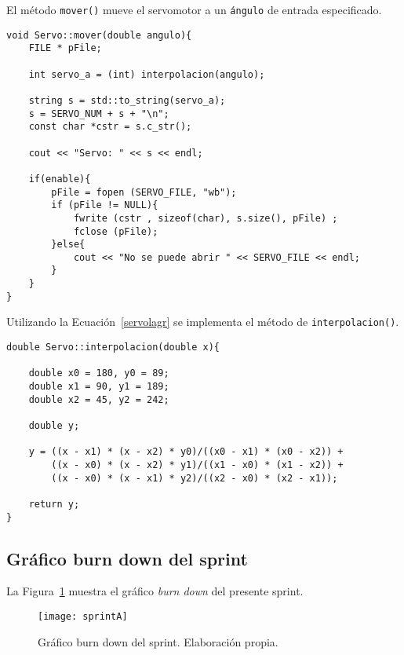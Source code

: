 El método \texttt{mover()} mueve el servomotor a un \texttt{ángulo} de entrada especificado.
\begin{lstlisting}[label=mover,caption=Método para mover un servomotor]
void Servo::mover(double angulo){
    FILE * pFile;

    int servo_a = (int) interpolacion(angulo);
    
    string s = std::to_string(servo_a);
    s = SERVO_NUM + s + "\n";
    const char *cstr = s.c_str();
    
    cout << "Servo: " << s << endl;

    if(enable){
        pFile = fopen (SERVO_FILE, "wb");
        if (pFile != NULL){
            fwrite (cstr , sizeof(char), s.size(), pFile) ;
            fclose (pFile);
        }else{
            cout << "No se puede abrir " << SERVO_FILE << endl;
        }
    }
}
\end{lstlisting}

Utilizando la Ecuación~\ref{servolagr} se implementa el método de \texttt{interpolacion()}.

\begin{lstlisting}[label=interpolacion,caption=Método para transformar de grados a modulación por ancho de pulso.]
double Servo::interpolacion(double x){
    
    double x0 = 180, y0 = 89;
    double x1 = 90, y1 = 189;
    double x2 = 45, y2 = 242;

    double y;

    y = ((x - x1) * (x - x2) * y0)/((x0 - x1) * (x0 - x2)) + 
        ((x - x0) * (x - x2) * y1)/((x1 - x0) * (x1 - x2)) + 
        ((x - x0) * (x - x1) * y2)/((x2 - x0) * (x2 - x1));

    return y;
}

\end{lstlisting}

\subsection{Gráfico burn down del sprint}
La Figura~\ref{fig:sprintA} muestra el gráfico \emph{burn down} del presente sprint.

\begin{figure}
  \centering
    \texttt{[image: sprintA]}
  \caption{Gráfico burn down del sprint. Elaboración propia.}
  \label{fig:sprintA}
\end{figure}

